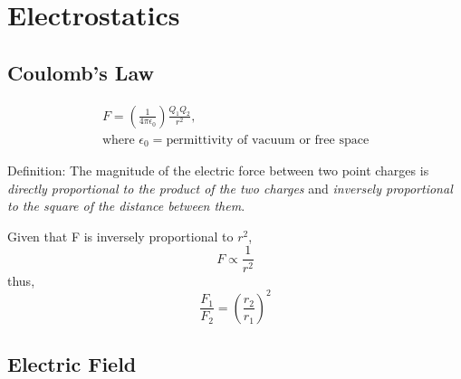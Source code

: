 \documentclass[../main.tex]{subfiles}
\begin{document}
\setcounter{chapter}{11}
\chapter{Electrostatics}

\section{Coulomb's Law}

\begin{gather*}
    F=(\frac{1}{4\pi\epsilon_0})\frac{Q_1Q_2}{r^2}, \\
    \text{where } \epsilon_0= \text{permittivity of vacuum or free space}
\end{gather*}

\begin{mdframed}
    Definition: The magnitude of the electric force between two point charges is \emph{directly proportional to the product of the two charges} and \emph{inversely proportional to the square of the distance between them}.
\end{mdframed}
Given that F is inversely proportional to \(r^2\),
\begin{equation}
    F \propto \frac{1}{r^2}
\end{equation}
thus,
\begin{equation}
    \frac{F_1}{F_2}=(\frac{r_2}{r_1})^2
\end{equation}

\section{Electric Field}
\end{document}
